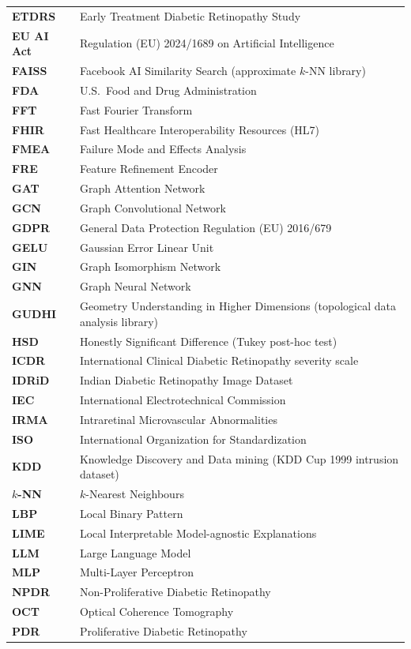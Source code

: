 \begin{longtable}{@{}>{\bfseries}l P{12.1cm}@{}}
ETDRS & Early Treatment Diabetic Retinopathy Study \\
EU AI Act & Regulation (EU) 2024/1689 on Artificial Intelligence \\
FAISS & Facebook AI Similarity Search (approximate $k$-NN library) \\
FDA & U.S.\ Food and Drug Administration \\
FFT & Fast Fourier Transform \\
FHIR & Fast Healthcare Interoperability Resources (HL7) \\
FMEA & Failure Mode and Effects Analysis \\
FRE & Feature Refinement Encoder \\
GAT & Graph Attention Network \\
GCN & Graph Convolutional Network \\
GDPR & General Data Protection Regulation (EU) 2016/679 \\
GELU & Gaussian Error Linear Unit \\
GIN & Graph Isomorphism Network \\
GNN & Graph Neural Network \\
GUDHI & Geometry Understanding in Higher Dimensions (topological data analysis library) \\
HSD & Honestly Significant Difference (Tukey post-hoc test) \\
ICDR & International Clinical Diabetic Retinopathy severity scale \\
IDRiD & Indian Diabetic Retinopathy Image Dataset \\
IEC & International Electrotechnical Commission \\
IRMA & Intraretinal Microvascular Abnormalities \\
ISO & International Organization for Standardization \\
KDD & Knowledge Discovery and Data mining (KDD Cup 1999 intrusion dataset) \\
$k$-NN & $k$-Nearest Neighbours \\
LBP & Local Binary Pattern \\
LIME & Local Interpretable Model-agnostic Explanations \\
LLM & Large Language Model \\
MLP & Multi-Layer Perceptron \\
NPDR & Non-Proliferative Diabetic Retinopathy \\
OCT & Optical Coherence Tomography \\
PDR & Proliferative Diabetic Retinopathy \\

\end{longtable}
